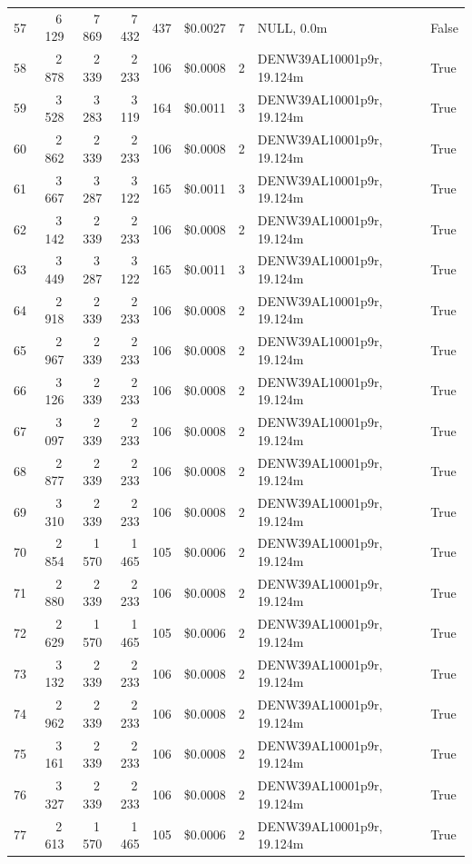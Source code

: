 \documentclass[a4paper,11pt]{article}
\begin{document}
\begin{table}[ht]
\begin{tabular}{r r r r r r r p{3cm} l}
57 & 6\,129 & 7\,869 & 7\,432 & 437 & \$0.0027 & 7 & NULL, 0.0m & False \\
58 & 2\,878 & 2\,339 & 2\,233 & 106 & \$0.0008 & 2 & DENW39AL10001p9r, 19.124m & True \\
59 & 3\,528 & 3\,283 & 3\,119 & 164 & \$0.0011 & 3 & DENW39AL10001p9r, 19.124m & True \\
60 & 2\,862 & 2\,339 & 2\,233 & 106 & \$0.0008 & 2 & DENW39AL10001p9r, 19.124m & True \\
61 & 3\,667 & 3\,287 & 3\,122 & 165 & \$0.0011 & 3 & DENW39AL10001p9r, 19.124m & True \\
62 & 3\,142 & 2\,339 & 2\,233 & 106 & \$0.0008 & 2 & DENW39AL10001p9r, 19.124m & True \\
63 & 3\,449 & 3\,287 & 3\,122 & 165 & \$0.0011 & 3 & DENW39AL10001p9r, 19.124m & True \\
64 & 2\,918 & 2\,339 & 2\,233 & 106 & \$0.0008 & 2 & DENW39AL10001p9r, 19.124m & True \\
65 & 2\,967 & 2\,339 & 2\,233 & 106 & \$0.0008 & 2 & DENW39AL10001p9r, 19.124m & True \\
66 & 3\,126 & 2\,339 & 2\,233 & 106 & \$0.0008 & 2 & DENW39AL10001p9r, 19.124m & True \\
67 & 3\,097 & 2\,339 & 2\,233 & 106 & \$0.0008 & 2 & DENW39AL10001p9r, 19.124m & True \\
68 & 2\,877 & 2\,339 & 2\,233 & 106 & \$0.0008 & 2 & DENW39AL10001p9r, 19.124m & True \\
69 & 3\,310 & 2\,339 & 2\,233 & 106 & \$0.0008 & 2 & DENW39AL10001p9r, 19.124m & True \\
70 & 2\,854 & 1\,570 & 1\,465 & 105 & \$0.0006 & 2 & DENW39AL10001p9r, 19.124m & True \\
71 & 2\,880 & 2\,339 & 2\,233 & 106 & \$0.0008 & 2 & DENW39AL10001p9r, 19.124m & True \\
72 & 2\,629 & 1\,570 & 1\,465 & 105 & \$0.0006 & 2 & DENW39AL10001p9r, 19.124m & True \\
73 & 3\,132 & 2\,339 & 2\,233 & 106 & \$0.0008 & 2 & DENW39AL10001p9r, 19.124m & True \\
74 & 2\,962 & 2\,339 & 2\,233 & 106 & \$0.0008 & 2 & DENW39AL10001p9r, 19.124m & True \\
75 & 3\,161 & 2\,339 & 2\,233 & 106 & \$0.0008 & 2 & DENW39AL10001p9r, 19.124m & True \\
76 & 3\,327 & 2\,339 & 2\,233 & 106 & \$0.0008 & 2 & DENW39AL10001p9r, 19.124m & True \\
77 & 2\,613 & 1\,570 & 1\,465 & 105 & \$0.0006 & 2 & DENW39AL10001p9r, 19.124m & True \\

\end{tabular}
\end{table}
\end{document}
